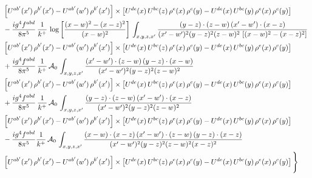 \documentclass[9pt]{article}
\numberwithin{equation}{section}
\begin{document}
\begin{align}
& \left[U^{ab'}(x')\,\rho^{b'}(x')-U^{ab'}(w')\, \rho^{b'}(x')\right]\times \left[U^{de}(x)\,U^{bc}(z)\, \rho^{e}(x)\,\rho^{c}(y)-U^{de}(x)\,U^{bc}(y)\,\rho^{e}(x)\,\rho^{c}(y)\right] \notag \\
& -\frac{ig^{4}f^{abd}}{8\pi^{5}}\,\frac{1}{k^{+}}\,\log{\left[\frac{(x-w)^{2}-(x-z)^{2}}{(x-w)^{2}}\right]}\,\int_{x,y,z,x'}
\frac{(y-z)\cdot(z-w)\,(x'-w')\cdot(x-z)}{(x'-w')^{2}(y-z)^{2}(z-w)^{2}\,\left[(x-w)^{2}-(x-z)^{2}\right]}\notag \\ & \left[U^{ab'}(x')\,\rho^{b'}(x')-U^{ab'}(w')\, \rho^{b'}(x')\right]\times \left[U^{de}(x)\,U^{bc}(z)\, \rho^{e}(x)\,\rho^{c}(y)-U^{de}(x)\,U^{bc}(y)\,\rho^{e}(x)\,\rho^{c}(y)\right] \notag \\
& +\frac{ig^{4}f^{abd}}{8\pi^{5}}\,\frac{1}{k^{+}}\,\mathcal{A}_{0}\,\int_{x,y,z,x'}
\frac{(x'-w')\cdot(z-w)\,(y-z)\cdot(x-w)}{(x'-w')^{2}(y-z)^{2}(z-w)^{2}}\notag \\
& \left[U^{ab'}(x')\,\rho^{b'}(x')-U^{ab'}(w')\, \rho^{b'}(x')\right]\times \left[U^{de}(x)\,U^{bc}(z)\, \rho^{e}(x)\,\rho^{c}(y)-U^{de}(x)\,U^{bc}(y)\,\rho^{e}(x)\,\rho^{c}(y)\right] \notag \\
& +\frac{ig^{4}f^{abd}}{8\pi^{5}}\,\frac{1}{k^{+}}\,\mathcal{A}_{0}\,\int_{x,y,z,x'}
\frac{(y-z)\cdot(z-w)\,(x'-w')\cdot(x-z)}{(x'-w')^{2}(y-z)^{2}(z-w)^{2}}\notag \\ & \left[U^{ab'}(x')\,\rho^{b'}(x')-U^{ab'}(w')\, \rho^{b'}(x')\right]\times \left[U^{de}(x)\,U^{bc}(z)\, \rho^{e}(x)\,\rho^{c}(y)-U^{de}(x)\,U^{bc}(y)\,\rho^{e}(x)\,\rho^{c}(y)\right] \notag \\
& -\frac{ig^{4}f^{abd}}{8\pi^{5}}\frac{1}{k^{+}}\,\mathcal{A}_{0}\,\int_{x,y,z,x'}
\frac{(x-w)\cdot(x-z)\,(x'-w')\cdot(z-w)\,(y-z)\cdot(x-z)}{(x'-w')^{2}(y-z)^{2}(z-w)^{2}(x-z)^{2}}\notag \\ & \left[U^{ab'}(x')\,\rho^{b'}(x')-U^{ab'}(w')\, \rho^{b'}(x')\right]\times \left[U^{de}(x)\,U^{bc}(z)\, \rho^{e}(x)\,\rho^{c}(y)-U^{de}(x)\,U^{bc}(y)\,\rho^{e}(x)\,\rho^{c}(y)\right]\Bigg\}
\end{align}
\end{document}
